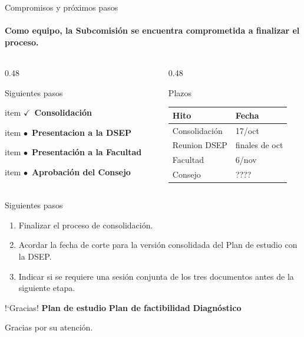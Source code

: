 \documentclass[10pt,aspectratio=169]{beamer}
\newcommand{\doc}[1]{\textbf{\textcolor{accentblue}{#1}}}
\newcommand{\estadoverde}[2][\textwidth]{%
  \begin{beamercolorbox}[wd=#1,sep=0.6ex,rounded=true]{item}
    \textcolor{accentgreen}{$\checkmark$\ \textbf{#2}}
  \end{beamercolorbox}}
\newcommand{\estadoambar}[2][\textwidth]{%
  \begin{beamercolorbox}[wd=#1,sep=0.6ex,rounded=true]{item}
    \textcolor{accentorange}{$\bullet$\ \textbf{#2}}
  \end{beamercolorbox}}
\begin{document}
\begin{frame}{Compromisos y próximos pasos}
    \framesubtitle{Como equipo, la Subcomisión se encuentra comprometida a finalizar el proceso.}
  \small
  \begin{columns}[t]
    \begin{column}{0.48\textwidth}
        \begin{block}{Siguientes pasos}
        \footnotesize
             \estadoverde{Consolidación}
            \estadoambar{Presentacion a la DSEP}
            \estadoambar{Presentación a la Facultad}
            \estadoambar{Aprobación del Consejo}
      \end{block}
    \end{column}
    \begin{column}{0.48\textwidth}
      \begin{block}{Plazos}
        \footnotesize
        \begin{tabular}{@{}ll@{}}
          \toprule
          Hito & Fecha \\
          \midrule
          Consolidación & 17/oct \\
          Reunion DSEP & finales de oct \\
          Facultad & 6/nov\\
          Consejo & ????\\
          \bottomrule
        \end{tabular}
      \end{block}
    \end{column}
  \end{columns}

  \vfill
  \begin{alertblock}{Siguientes pasos}
    \footnotesize
    \begin{enumerate}
        \item Finalizar el proceso de consolidación.
            
      \item Acordar la fecha de corte para la versión consolidada del
          Plan de estudio con la DSEP.
      \item Indicar si se requiere una sesión conjunta de los tres
            documentos antes de la siguiente etapa.
    \end{enumerate}
  \end{alertblock}
\end{frame}

\begin{frame}{!`Gracias!}
  \vspace{0.8cm}
  \centering
  {\Large\doc{Plan de estudio}} \textcolor{gray}{\textbullet}
  {\Large\doc{Plan de factibilidad}} \textcolor{gray}{\textbullet}
  {\Large\doc{Diagnóstico}}


  \vfill
  {\footnotesize\color{gray} Gracias por su atención.}
\end{frame}
\end{document}
